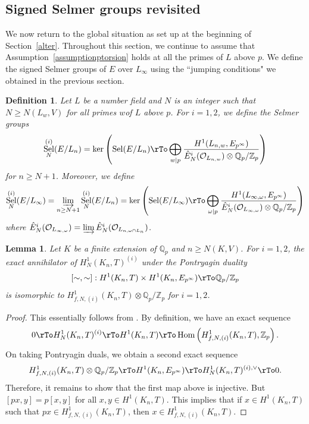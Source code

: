 \documentclass{amsart}
\newcommand{\QQ}{\mathbb Q}
\newcommand{\ZZ}{\mathbb Z}
\DeclareMathOperator{\Sel}{Sel}
\DeclareMathOperator{\Hom}{Hom}
\newcommand{\Ep}{E_{p^\infty}}
\newcommand{\Qp}{\QQ_p}
\newcommand{\Zp}{\ZZ_p}
\newcommand{\calO}{\mathcal{O}}
\newtheorem{lemma}[theorem]{Lemma}
\newtheorem{definition}[theorem]{Definition}
\begin{document}

 \subsection{Signed Selmer groups revisited}
 
  We now return to the global situation as set up at the beginning of Section~\ref{alter}. Throughout this section, we continue to assume that Assumption~\ref{assumptionptorsion} holds at all the primes of $L$ above $p$. We define the signed Selmer groups of $E$ over $L_\infty$ using the ``jumping conditions" we obtained in the previous section.

  \begin{definition}
   Let $L$ be a number field and $N$ is an integer such that $N\ge N(L_w,V)$ for all primes $w$of $L$ above $p$. For $i=1,2$, we define the Selmer groups
   \[
   \Sel^{(i)}_N(E/L_n)=\ker\left(\Sel(E/L_n)\rTo \bigoplus_{w\mid p}\frac{H^1(L_{n,w},\Ep)}{\hat{E}_N^i(\calO_{L_{n,w}})\otimes\Qp/\Zp }\right)
   \]
   for $n\ge N+1$. Moreover, we define
   \[
    \Sel^{(i)}_N(E/L_\infty)=\varinjlim_{n\ge N+1}\Sel^{(i)}_N(E/L_n)=\ker\left(\Sel(E/L_\infty)\rTo \bigoplus_{\omega\mid p} \frac{H^1(L_{\infty,\omega},\Ep)}{\hat{E}_N^i(\calO_{L_{\infty,\omega}})\otimes\Qp/\Zp} \right)
   \]
   where $\hat{E}_N^i(\calO_{L_{\infty,\omega}})=\varinjlim \hat{E}_N^i(\calO_{L_{n,\omega\cap L_n}})$.
  \end{definition}

  \begin{lemma}\label{duals}
   Let $K$ be a finite extension of $\Qp$ and $n\ge N(K,V)$. For $i=1,2$, the exact annihilator of $H_N^1(K_n,T)^{(i)}$ under the Pontryagin duality
   \[
    [\sim,\sim]: H^1(K_n,T)\times H^1(K_n,\Ep)\rTo\Qp\slash\Zp
   \]
   is isomorphic to $H^1_{f,N,(i)}(K_n,T)\otimes\Qp/\Zp$ for $i=1,2$.
  \end{lemma}
  \begin{proof}
   This essentially follows from \cite[proofs of Lemma~8.17 and Proposition~8.18]{kobayashi03}. By definition, we have an exact sequence
   \[
    0\rTo H_N^1(K_n,T)^{(i)} \rTo H^1(K_n,T)\rTo\Hom\left(H^1_{f,N,(i)}(K_n,T),\Zp\right).
   \]
   On taking Pontryagin duals, we obtain a second exact sequence
   \[
    H^1_{f,N,(i)}(K_n,T)\otimes\Qp/\Zp\rTo H^1(K_n,\Ep)\rTo H_N^1(K_n,T)^{(i),\vee}\rTo0.
   \]
   Therefore, it remains to show that the first map above is injective. But $[px,y]=p[x,y]$ for all $x,y\in H^1(K_n,T)$. This implies that if $x\in H^1(K_n,T)$ such that $px\in H^1_{f,N,(i)}(K_n,T)$, then $x\in H^1_{f,N,(i)}(K_n,T)$.
  \end{proof}
\end{document}

